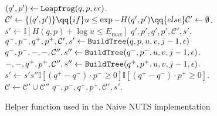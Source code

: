\begin{figure}[H]
	\begin{algorithm}[H]
	\caption{Helper function used in the Naive NUTS implementation}\label{algo:build_tree}
	\begin{algorithmic}
             

                \State $(q', p') \leftarrow {\tt Leapfrog}(q, p, v\epsilon)$.
                \State $\mathcal{C}' \leftarrow \{(q', p')\} \qq{if} u \leq \exp{-H(q', p')} \qq{else} \mathcal{C}' \leftarrow \emptyset$.
                \State $s' \leftarrow \mathbb{I}[H(q, p) + \log u \leq E_\text{max}]$ 
                \State \Return $q', p', q', p', \mathcal{C}', s'$. 
            \Else {}
                \State $q^-, p^-, q^+, p^+, \mathcal{C}', s' \leftarrow {\tt BuildTree}(q, p, u, v, j - 1, \epsilon)$
                    \State $q^-, p^-, -, -, \mathcal{C}'', s'' \leftarrow {\tt BuildTree}(q^-, p^-, u, v, j - 1, \epsilon)$.
                \Else
                    \State $-, -, q^+, p^+, \mathcal{C}'', s'' \leftarrow {\tt BuildTree}(q^+, p^+, u, v, j - 1, \epsilon)$.
                \EndIf
                \State $s' \leftarrow s' s'' \mathbb{I}[(q^+ - q^-) \cdot p^- \geq 0] \mathbb{I}[(q^+ - q^-) \cdot p^+ \geq 0]$. 
                \State $\mathcal{C} \leftarrow \mathcal{C}' \cup \mathcal{C}''$  
                \State \Return $q^-, p^-, q^+, p^+, \mathcal{C}', s'$.
            \EndIf
        \EndFunction
	\end{algorithmic}
	\end{algorithm}
\end{figure}



